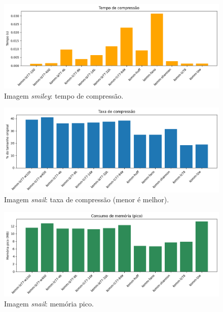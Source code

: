 \begin{figure}[htp]
  \centering
  \caption{Imagem \textit{smiley}: tempo de compressão.}
  \label{fig:komm-smiley-time}
  \includegraphics[width=15cm]{figuras/komm_smiley_time.png}
\end{figure}

\begin{figure}[htp]
  \centering
  \caption{Imagem \textit{snail}: taxa de compressão (menor é melhor).}
  \label{fig:komm-snail-compression}
  \includegraphics[width=15cm]{figuras/komm_snail_compression.png}
\end{figure}

\begin{figure}[htp]
  \centering
  \caption{Imagem \textit{snail}: memória pico.}
  \label{fig:komm-snail-memory}
  \includegraphics[width=15cm]{figuras/komm_snail_memory.png}
\end{figure}


